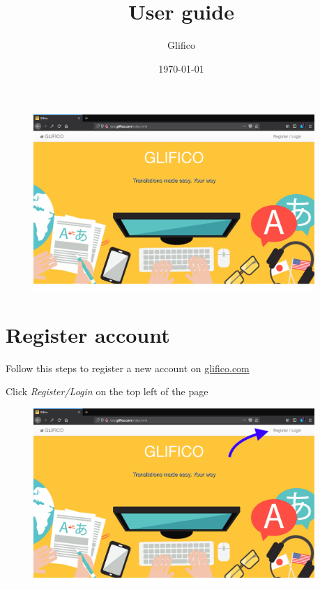 \documentclass[11 pt, a4paper]{article}
\author{Glifico}
\date{\today}
\title{User guide}
\begin{document}
\maketitle
\begin{figure}[htb!]
\centering
\includegraphics[width=0.95\textwidth]{home.png}
\end{figure}

\newpage
\tableofcontents
\clearpage

\section{Register account}
Follow this steps to register a new account on \url{glifico.com}

Click \textit{Register/Login} on the top left of the page
\begin{figure}[H]
\centering
\includegraphics[width=0.95\textwidth]{register_translator0.png}
\end{figure}
\end{document}
